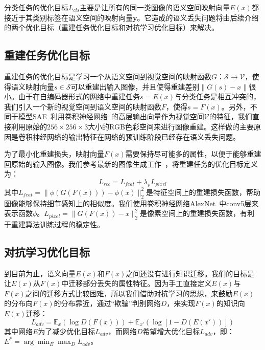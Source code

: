分类任务的优化目标$L_{cls}$主要是让所有的同一类图像的语义空间映射向量$E(x)$都接近于其类别标签在语义空间的映射向量$\bm{y}$。它造成的语义丢失问题将由后续介绍的两个优化目标（重建任务优化目标和对抗学习优化目标）来解决。


\subsection{重建任务优化目标}
重建任务的优化目标是学习一个从语义空间到视觉空间的映射函数$G$：$\mathcal{S}\rightarrow \mathcal{V}$，使得语义映射向量$s\in\mathcal{S}$可以重建出输入图像，并且使得重建差别$\|G(s)-x\|$很小。由于在自编码器形式的网络中重建任务$s = E(x)$与分类任务是相互冲突的，我们引入一个新的视觉空间到语义空间的映射函数$F$，使得$s = F(x)$。另外，不同于模型SAE~\cite{kodirov2017semantic}利用卷积神经网络~\cite{he2016deep,simonyan2015very}的高层输出向量作为视觉空间$\mathcal{V}$的特征，我们直接利用原始的$256\times 256 \times 3$大小的RGB色彩空间来进行图像重建。这样做的主要原因是卷积神经网络的输出特征在网络的预训练阶段已经存在语义丢失问题。


为了最小化重建损失，映射向量$F(x)$需要保持尽可能多的属性，以便于能够重建回原始的输入图像。我们参考最新的图像生成工作~\cite{johnson2016perceptual,dosovitskiy2016generating,ledig2017photo}，将重建任务的优化目标定义为：
\begin{equation}\label{ch3:eq:eq_3}
L_{rec} = L_{feat}+\lambda_p L_{pixel}
\end{equation}
其中$L_{feat} = \|\phi\left(G\left(F(x)\right)\right)-\phi(x)\|^2_2$是特征空间上的重建损失函数，帮助图像能够保持细节感知上的相似度。我们使用卷积神经网络AlexNet~\cite{krizhevsky2012imagenet}中conv5层来表示函数$\phi$。$L_{pixel} = \|G(F(x))-x\|^2_2$是像素空间上的重建损失函数，有利于重建算法训练过程的稳定性。


\subsection{对抗学习优化目标}
到目前为止，语义向量$E(x)$和$F(x)$之间还没有进行知识迁移。我们的目标是让$E(x)$从$F(x)$中迁移部分丢失的属性特征。因为手工直接定义$E(x)$与$F(x)$之间的迁移方式比较困难，所以我们借助对抗学习的思想，来鼓励$E(x)$的分布向$F(x)$的分布靠近，通过“欺骗”判别网络$D$，来实现$F(x)$的知识向$E(x)$迁移：
\begin{equation} \label{ch3:eq:eq_4}
L_{adv} = \mathbb{E}_{x}\left( \log D(F(x)) \right) + \mathbb{E}_{x'}\left( \log \left[1-D(E(x'))\right] \right)
\end{equation}
其中网络$E$为了减少优化目标$L_{adv}$，而网络$D$希望增大优化目标$L_{adv}$，即：$E^* = \arg\min_E \max_D L_{adv}$。

